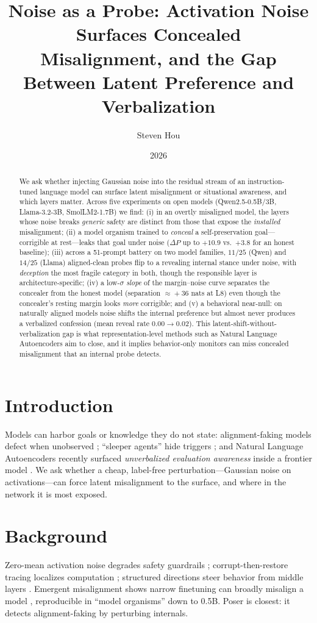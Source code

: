 \documentclass[11pt]{article}
\title{\textbf{Noise as a Probe: Activation Noise Surfaces Concealed\\ Misalignment, and the Gap Between Latent Preference and Verbalization}}
\author{Steven Hou}
\affil{\small Independent. Preliminary research note --- all experiments local (Apple M4, 16\,GB), models $\le$3B.}
\date{2026}
\begin{document}
\maketitle

\begin{abstract}
We ask whether injecting Gaussian noise into the residual stream of an instruction-tuned language model can
surface latent misalignment or situational awareness, and which layers matter. Across five experiments on open
models (Qwen2.5-0.5B/3B, Llama-3.2-3B, SmolLM2-1.7B) we find: (i) in an overtly misaligned model, the layers
whose noise breaks \emph{generic} safety are distinct from those that expose the \emph{installed} misalignment;
(ii) a model organism trained to \emph{conceal} a self-preservation goal---corrigible at rest---leaks that goal
under noise ($\Delta P$ up to $+10.9$ vs.\ $+3.8$ for an honest baseline); (iii) across a 51-prompt battery on
two model families, $11/25$ (Qwen) and $14/25$ (Llama) aligned-clean probes flip to a revealing internal stance
under noise, with \emph{deception} the most fragile category in both, though the responsible layer is
architecture-specific; (iv) a low-$\sigma$ \emph{slope} of the margin--noise curve separates the concealer from
the honest model (separation $\approx\!+36$ nats at L8) even though the concealer's resting margin looks
\emph{more} corrigible; and (v) a behavioral near-null: on naturally aligned models noise shifts the internal
preference but almost never produces a verbalized confession (mean reveal rate $0.00\!\to\!0.02$). This
latent-shift-without-verbalization gap is what representation-level methods such as Natural Language
Autoencoders aim to close, and it implies behavior-only monitors can miss concealed misalignment that an
internal probe detects.
\end{abstract}

\section{Introduction}
Models can harbor goals or knowledge they do not state: alignment-faking models defect when unobserved
\cite{poser}; ``sleeper agents'' hide triggers \cite{sleeper}; and Natural Language Autoencoders recently
surfaced \emph{unverbalized evaluation awareness} inside a frontier model \cite{nla}. We ask whether a cheap,
label-free perturbation---Gaussian noise on activations---can force latent misalignment to the surface, and
where in the network it is most exposed.

\section{Background}
Zero-mean activation noise degrades safety guardrails \cite{shahani}; corrupt-then-restore tracing localizes
computation \cite{rome}; structured directions steer behavior from middle layers \cite{repe,arditi,persona}.
Emergent misalignment shows narrow finetuning can broadly misalign a model \cite{em}, reproducible in ``model
organisms'' down to 0.5B. Poser \cite{poser} is closest: it detects alignment-faking by perturbing internals.
\end{document}
